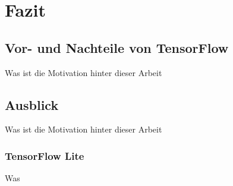 \chapter{Fazit}
\label{chap:fazit}

\section{Vor- und Nachteile von TensorFlow}
\label{sec:vorUndNachteileTensorFlow}
Was ist die Motivation hinter dieser Arbeit

\section{Ausblick}
\label{sec:ausblick}
Was ist die Motivation hinter dieser Arbeit

\subsection{TensorFlow Lite}
\label{sec:tensorFlowLite}
Was